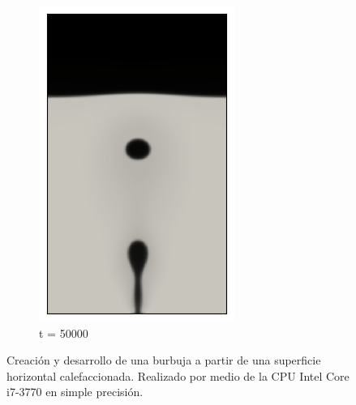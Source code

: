 \begin{figure}[H]
\begin{subfigure}{0.25\textwidth}
		\includegraphics[width=\linewidth]{figs/cap4/bb_760_s50}
		\caption{t = 50000}
		\label{fig:9}
	\end{subfigure}
	\caption{Creación y desarrollo de una burbuja a partir de una superficie horizontal calefaccionada. Realizado por medio de la CPU Intel Core i7-3770 en simple precisión. }
	\label{fig:burbujas_760_simple}
\end{figure}

\newpage

\newpage

